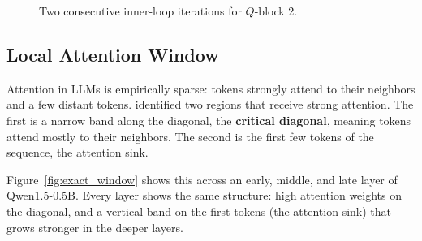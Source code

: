 \begin{figure}[h]
{
}
\caption{Two consecutive inner-loop iterations for $Q$-block 2.}
\label{fig:flashattn_snapshot}
\end{figure}

\subsection{Local Attention Window}
\label{sec:local_attention_window}

Attention in LLMs is empirically sparse: tokens strongly attend to their neighbors and a few distant tokens. \citet{xiao2023streamingllm} identified two regions that receive strong attention. The first is a narrow band along the diagonal, the \textbf{critical diagonal}, meaning tokens attend mostly to their neighbors. The second is the first few tokens of the sequence, the attention sink.

Figure~\ref{fig:exact_window} shows this across an early, middle, and late layer of Qwen1.5-0.5B. Every layer shows the same structure: high attention weights on the diagonal, and a vertical band on the first tokens (the attention sink) that grows stronger in the deeper layers.

